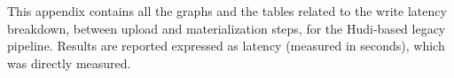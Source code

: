 This appendix contains all the graphs and the tables related to the write latency breakdown, between upload and materialization steps, for the Hudi-based legacy pipeline. Results are reported expressed as latency (measured in seconds), which was directly measured.
